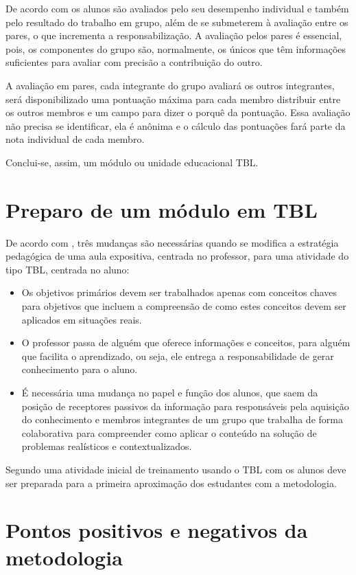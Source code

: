 De acordo com \cite{bollela} os alunos são avaliados pelo seu desempenho individual e também pelo resultado do trabalho em grupo, além de se submeterem à avaliação entre os pares, o que incrementa a responsabilização. A avaliação pelos pares é essencial, pois, os componentes do grupo são, normalmente, os únicos que têm informações suficientes para avaliar com precisão a contribuição do outro.

A avaliação em pares, cada integrante do grupo avaliará os outros integrantes, será disponibilizado uma pontuação máxima para cada membro distribuir entre os outros membros e um campo para dizer o porquê da pontuação. Essa avaliação não precisa se identificar, ela é anônima e o cálculo das pontuações fará parte da nota individual de cada membro.

Conclui-se, assim, um módulo ou unidade educacional TBL.

\section{Preparo de um módulo em TBL}

De acordo com \cite{bollela}, três mudanças são necessárias quando se modifica a estratégia pedagógica de uma aula expositiva, centrada no professor, para uma atividade do tipo TBL, centrada no aluno:

\begin{itemize}
  \item Os objetivos primários devem ser trabalhados apenas com conceitos chaves para objetivos que incluem a compreensão de como estes conceitos devem ser aplicados em situações reais.
  \item O professor passa de alguém que oferece informações e conceitos, para alguém que facilita o aprendizado, ou seja, ele entrega a responsabilidade de gerar conhecimento para o aluno.
  \item É necessária uma mudança no papel e função dos alunos, que saem da posição de receptores passivos da informação para responsáveis pela aquisição do conhecimento e membros integrantes de um grupo que trabalha de forma colaborativa para compreender como aplicar o conteúdo na solução de problemas realísticos e contextualizados.
\end{itemize}

Segundo \cite{bollela} uma atividade inicial de treinamento usando o TBL com os alunos deve ser preparada para a primeira aproximação dos estudantes com a metodologia.

\section{Pontos positivos e negativos da metodologia}

